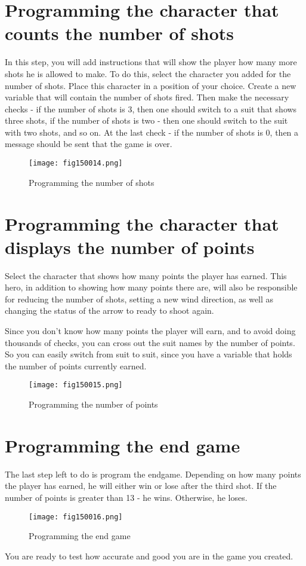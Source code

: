 \section{Programming the character that counts the number of shots}

In this step, you will add instructions that will show the player how many more shots he is allowed to make. To do this, select the character you added for the number of shots. Place this character in a position of your choice. Create a new variable that will contain the number of shots fired. Then make the necessary checks - if the number of shots is 3, then one should switch to a suit that shows three shots, if the number of shots is two - then one should switch to the suit with two shots, and so on. At the last check - if the number of shots is 0, then a message should be sent that the game is over.

\begin{figure}[H]
   \centering
   \texttt{[image: fig150014.png]}
   \caption{Programming the number of shots}
\label{fig150014}
\end{figure}

\section{Programming the character that displays the number of points}

Select the character that shows how many points the player has earned. This hero, in addition to showing how many points there are, will also be responsible for reducing the number of shots, setting a new wind direction, as well as changing the status of the arrow to ready to shoot again.

Since you don't know how many points the player will earn, and to avoid doing thousands of checks, you can cross out the suit names by the number of points. So you can easily switch from suit to suit, since you have a variable that holds the number of points currently earned.

\begin{figure}[H]
   \centering
   \texttt{[image: fig150015.png]}
   \caption{Programming the number of points}
\label{fig150015}
\end{figure}

\section{Programming the end game}

The last step left to do is program the endgame. Depending on how many points the player has earned, he will either win or lose after the third shot. If the number of points is greater than 13 - he wins. Otherwise, he loses.

\begin{figure}[H]
   \centering
   \texttt{[image: fig150016.png]}
   \caption{Programming the end game}
\label{fig150016}
\end{figure}

You are ready to test how accurate and good you are in the game you created.
